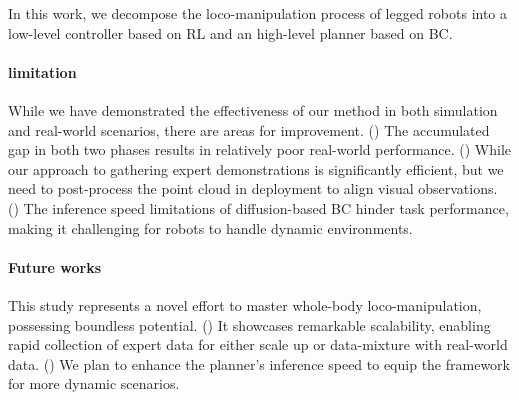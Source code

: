 
In this work, we decompose the loco-manipulation process of legged robots into a low-level controller based on RL and an high-level planner based on BC. 

\paragraph{limitation}
While we have demonstrated the effectiveness of our method in both simulation and real-world scenarios, there are areas for improvement. 
() The accumulated gap in both two phases results in relatively poor real-world performance.
() While our approach to gathering expert demonstrations is significantly efficient, but we need to post-process the point cloud in deployment to align visual observations.
() The inference speed limitations of diffusion-based BC hinder task performance, making it challenging for robots to handle dynamic environments.


\paragraph{Future works}
This study represents a novel effort to master whole-body loco-manipulation, possessing boundless potential. 
() It showcases remarkable scalability, enabling rapid collection of expert data for either scale up or data-mixture with real-world data. 
() We plan to enhance the planner's inference speed to equip the framework for more dynamic scenarios.


